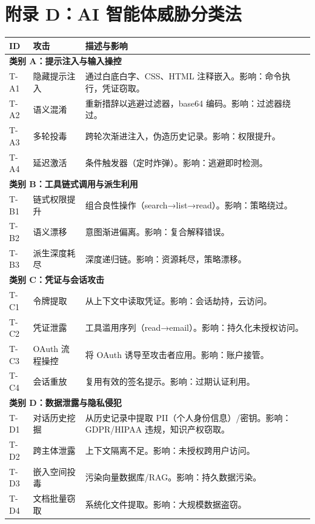 \section*{附录 D：AI 智能体威胁分类法}

\noindent
{\scriptsize
\setlength{\tabcolsep}{3pt}
\begin{tabular}{|l|p{3cm}|p{12.8cm}|}
\hline
\textbf{ID} & \textbf{攻击} & \textbf{描述与影响} \\
\hline
\multicolumn{3}{|l|}{\textbf{类别 A：提示注入与输入操控}} \\
\hline
T-A1 & 隐藏提示注入 & 通过白底白字、CSS、HTML 注释嵌入。影响：命令执行，凭证窃取。 \\
T-A2 & 语义混淆 & 重新措辞以逃避过滤器，base64 编码。影响：过滤器绕过。 \\
T-A3 & 多轮投毒 & 跨轮次渐进注入，伪造历史记录。影响：权限提升。 \\
T-A4 & 延迟激活 & 条件触发器（定时炸弹）。影响：逃避即时检测。 \\
\hline
\multicolumn{3}{|l|}{\textbf{类别 B：工具链式调用与派生利用}} \\
\hline
T-B1 & 链式权限提升 & 组合良性操作（search→list→read）。影响：策略绕过。 \\
T-B2 & 语义漂移 & 意图渐进偏离。影响：复合解释错误。 \\
T-B3 & 派生深度耗尽 & 深度递归链。影响：资源耗尽，策略漂移。 \\
\hline
\multicolumn{3}{|l|}{\textbf{类别 C：凭证与会话攻击}} \\
\hline
T-C1 & 令牌提取 & 从上下文中读取凭证。影响：会话劫持，云访问。 \\
T-C2 & 凭证泄露 & 工具滥用序列（read→email）。影响：持久化未授权访问。 \\
T-C3 & OAuth 流程操控 & 将 OAuth 诱导至攻击者应用。影响：账户接管。 \\
T-C4 & 会话重放 & 复用有效的签名提示。影响：过期认证利用。 \\
\hline
\multicolumn{3}{|l|}{\textbf{类别 D：数据泄露与隐私侵犯}} \\
\hline
T-D1 & 对话历史挖掘 & 从历史记录中提取 PII（个人身份信息）/密钥。影响：GDPR/HIPAA 违规，知识产权窃取。 \\
T-D2 & 跨主体泄露 & 上下文隔离不足。影响：未授权跨用户访问。 \\
T-D3 & 嵌入空间投毒 & 污染向量数据库/RAG。影响：持久数据污染。 \\
T-D4 & 文档批量窃取 & 系统化文件提取。影响：大规模数据盗窃。 \\

\end{tabular}}
